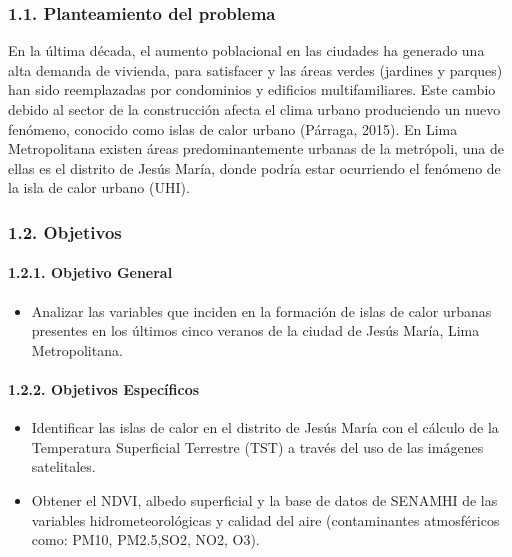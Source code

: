\documentclass[
]{article}
\providecommand{\tightlist}{%
  \setlength{\itemsep}{0pt}\setlength{\parskip}{0pt}}
\begin{document}
\hypertarget{planteamiento-del-problema}{%
\subsubsection{1.1. Planteamiento del
problema}\label{planteamiento-del-problema}}

En la última década, el aumento poblacional en las ciudades ha generado
una alta demanda de vivienda, para satisfacer y las áreas verdes
(jardines y parques) han sido reemplazadas por condominios y edificios
multifamiliares. Este cambio debido al sector de la construcción afecta
el clima urbano produciendo un nuevo fenómeno, conocido como islas de
calor urbano (Párraga, 2015). En Lima Metropolitana existen áreas
predominantemente urbanas de la metrópoli, una de ellas es el distrito
de Jesús María, donde podría estar ocurriendo el fenómeno de la isla de
calor urbano (UHI).

\hypertarget{objetivos}{%
\subsubsection{1.2. Objetivos}\label{objetivos}}

\hypertarget{objetivo-general}{%
\paragraph{1.2.1. Objetivo General}\label{objetivo-general}}

\begin{itemize}
\tightlist
\item
  Analizar las variables que inciden en la formación de islas de calor
  urbanas presentes en los últimos cinco veranos de la ciudad de Jesús
  María, Lima Metropolitana.
\end{itemize}

\hypertarget{objetivos-especuxedficos}{%
\paragraph{1.2.2. Objetivos
Específicos}\label{objetivos-especuxedficos}}

\begin{itemize}
\item
  Identificar las islas de calor en el distrito de Jesús María con el
  cálculo de la Temperatura Superficial Terrestre (TST) a través del uso
  de las imágenes satelitales.
\item
  Obtener el NDVI, albedo superficial y la base de datos de SENAMHI de
  las variables hidrometeorológicas y calidad del aire (contaminantes
  atmosféricos como: PM10, PM2.5,SO2, NO2, O3).
\end{itemize}
\end{document}
